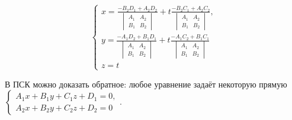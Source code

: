 \documentclass[a4paper]{article}
\begin{document}
\begin{hproof}
        \begin{equation}
            \displaystyle
            \begin{cases}
                x=\frac{\displaystyle -B_2D_1+A_2D_2}{\begin{vmatrix}
                                                          A_1 & A_2 \\
                                                          B_1 & B_2
                \end{vmatrix}} + t\frac{\displaystyle -B_2C_1+A_2C_2}{\begin{vmatrix}
                                                                          A_1 & A_2 \\
                                                                          B_1 & B_2
                \end{vmatrix}},
                \\
                y=\frac{\displaystyle -A_1D_2+B_1D_1}{\begin{vmatrix}
                                                          A_1 & A_2 \\
                                                          B_1 & B_2
                \end{vmatrix}} + t\frac{\displaystyle -A_1C_2+B_1C_1}{\begin{vmatrix}
                                                                          A_1 & A_2 \\
                                                                          B_1 & B_2
                \end{vmatrix}}
                \\ z = t
            \end{cases}
        \end{equation}


        В ПСК можно доказать обратное: любое уравнение задаёт некоторую прямую\newline $\begin{cases}
                                                                                            A_1x+B_1y+C_1z+D_1=0,
                                                                                            \\
                                                                                            A_2x+B_2y+C_2z+D_2=0
        \end{cases}$.


\end{hproof}
\end{document}
